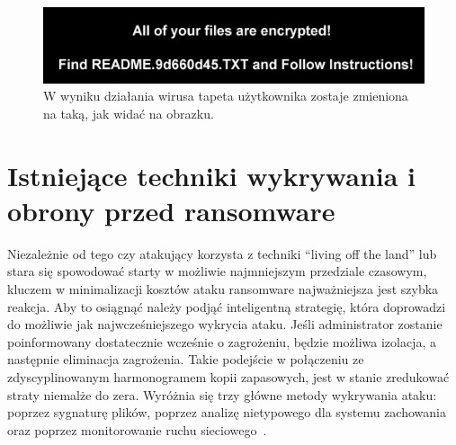 \begin{figure}[H]
    \centering
    \includegraphics[width=0.75\linewidth]{rysunki/tapeta.png}
    \caption{W wyniku działania wirusa tapeta użytkownika zostaje zmieniona na taką, jak widać na obrazku\protect \footnotemark.}
    \label{fig:enter-label}
\end{figure}
\section{Istniejące techniki wykrywania i obrony przed ransomware}
\label{sec:techniques}
Niezależnie od tego czy atakujący korzysta z techniki \foreignquote{english}{living off the land} lub stara się spowodować starty w możliwie najmniejszym przedziale czasowym, 
kluczem w minimalizacji kosztów ataku ransomware najważniejsza jest szybka reakcja. Aby to osiągnąć należy podjąć inteligentną strategię, która doprowadzi do możliwie jak najwcześniejszego wykrycia ataku.
Jeśli administrator zostanie poinformowany dostatecznie wcześnie o zagrożeniu, będzie możliwa izolacja, a następnie eliminacja zagrożenia. Takie podejście w połączeniu ze 
zdyscyplinowanym harmonogramem kopii zapasowych, jest w stanie zredukować straty niemalże do zera.
\newline
Wyróżnia się trzy główne metody wykrywania ataku: poprzez sygnaturę plików, poprzez analizę nietypowego dla systemu zachowania oraz poprzez monitorowanie ruchu sieciowego~\cite{vehabovic_ransomware_2022}.
